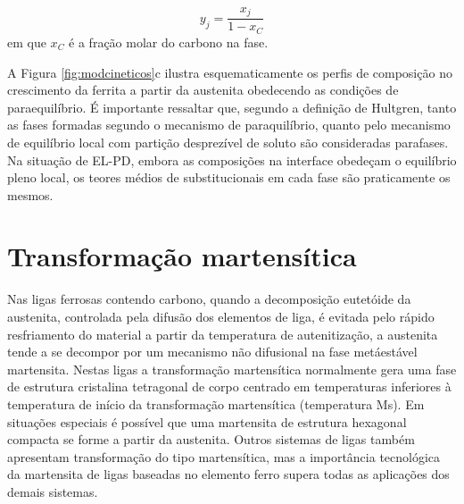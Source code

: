 \begin{equation}
  y_j = \frac{x_j}{1 - x_C}
\end{equation}
%
em que $x_C$ é a fração molar do carbono na fase.

A Figura \ref{fig:modcineticos}c ilustra esquematicamente os perfis de composição no crescimento da ferrita a partir da austenita obedecendo as condições de paraequilíbrio. É importante ressaltar que, segundo a definição de Hultgren, tanto as fases formadas segundo o mecanismo de paraquilíbrio, quanto pelo mecanismo de equilíbrio local com partição desprezível de soluto são consideradas parafases. Na situação de EL-PD, embora as composições na interface obedeçam o equilíbrio pleno local, os teores médios de substitucionais em cada fase são praticamente os mesmos\cite{Hillert2004a}.


\section{Transformação martensítica}

\label{sec:Martensita}

Nas ligas ferrosas contendo carbono, quando a decomposição eutetóide da austenita, controlada pela difusão dos elementos de liga, é evitada pelo rápido resfriamento do material a partir da temperatura de autenitização, a austenita tende a se decompor por um mecanismo não difusional na fase metáestável martensita. Nestas ligas a transformação martensítica normalmente gera uma fase de estrutura cristalina tetragonal de corpo centrado em temperaturas inferiores à temperatura de início da transformação martensítica (temperatura Ms). Em situações especiais é possível que uma martensita de estrutura hexagonal compacta se forme a partir da austenita. Outros sistemas de ligas também apresentam transformação do tipo martensítica, mas a importância tecnológica da martensita de ligas baseadas no elemento ferro supera todas as aplicações dos demais sistemas.


